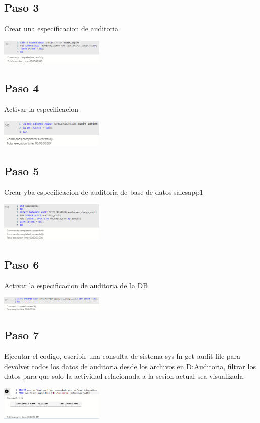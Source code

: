 \documentclass[twoside,twocolumn]{article}
\begin{document}
\subsection{Paso 3}
Crear una especificacion de auditoria
\begin{center}
	\includegraphics[width=5cm]{./Imagenes/3} 
\end{center}
\subsection{Paso 4}
Activar la especificacion
\begin{center}
	\includegraphics[width=5cm]{./Imagenes/4} 
\end{center}
\subsection{Paso 5}
Crear yba especificacion de auditoria de base de datos salesapp1
\begin{center}
	\includegraphics[width=5cm]{./Imagenes/5} 
\end{center}
\subsection{Paso 6}
Activar la especificacion de auditoria de la DB
\begin{center}
	\includegraphics[width=5cm]{./Imagenes/6} 
\end{center}
\subsection{Paso 7}
Ejecutar el codigo, escribir una consulta de sistema sys fn get audit file para devolver todos los datos de auditoria desde los archivos en D:Auditoria, filtrar los datos para que solo la actividad relacionada a la sesion actual sea visualizada.
\begin{center}
	\includegraphics[width=5cm]{./Imagenes/7} 
\end{center}
\end{document}
